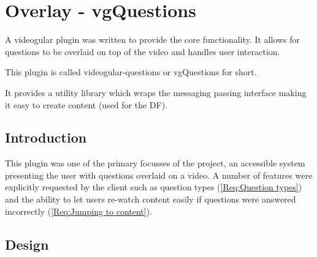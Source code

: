
\chapter{Overlay - vgQuestions} \label{Chapter:Overlay}

\begin{preamble}
A videogular plugin was written to provide the core functionality. It allows for questions to be overlaid on top of the video and handles user interaction.

This plugin is called videogular-questions or \gls{vgQuestions} for short.

It provides a utility library which wraps the messaging passing interface making it easy to create content (used for the \gls{DF}).

\end{preamble}

\section{Introduction}

This plugin was one of the primary focusses of the project, an accessible system presenting the user with questions overlaid on a video. A number of features were explicitly requested by the client such as question types (\cref{Req:Question types}) and the ability to let users re-watch content easily if questions were answered incorrectly (\cref{Req:Jumping to content}).

\section{Design}

